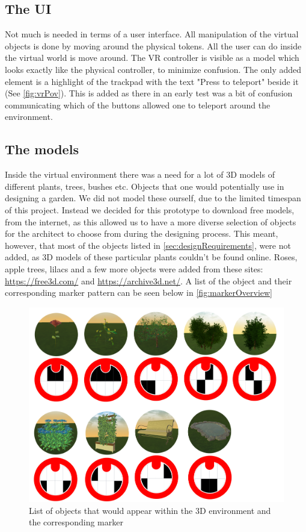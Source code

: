 \subsection{The UI}
Not much is needed in terms of a user interface. All manipulation of the virtual objects is done by moving around the physical tokens. All the user can do inside the virtual world is move around. The VR controller is visible as a model which looks exactly like the physical controller, to minimize confusion. The only added element is a highlight of the trackpad with the text "Press to teleport" beside it (See \autoref{fig:vrPov}). This is added as there in an early test was a bit of confusion communicating which of the buttons allowed one to teleport around the environment.

\subsection{The models}
Inside the virtual environment there was a need for a lot of 3D models of different plants, trees, bushes etc. Objects that one would potentially use in designing a garden. We did not model these ourself, due to the limited timespan of this project. Instead we decided for this prototype to download free models, from the internet, as this allowed us to have a more diverse selection of objects for the architect to choose from during the designing process. This meant, however, that most of the objects listed in \autoref{sec:designRequirements}, were not added, as 3D models of these particular plants couldn't be found online. Roses, apple trees, lilacs and a few more objects were added from these sites: \url{https://free3d.com/} and \url{https://archive3d.net/}. A list of the object and their corresponding marker pattern can be seen below in \autoref{fig:markerOverview}

\begin{figure}[H]
	\centering
	\includegraphics[width=0.9\linewidth]{figure/Appendices/markersOverview.png}
	\caption{List of objects that would appear within the 3D environment and the corresponding marker}
	\label{fig:markerOverview}
\end{figure}








